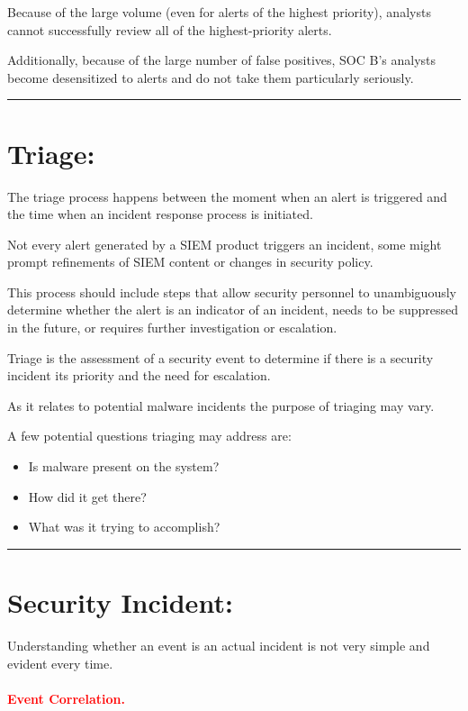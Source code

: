 \documentclass[british]{article}
\begin{document}
Because of the large volume (even for alerts of the highest priority),
analysts cannot successfully review all of the highest-priority alerts.

Additionally, because of the large number of false positives, SOC
B's analysts become desensitized to alerts and do not take them particularly
seriously.

\rule[0.5ex]{0.75\columnwidth}{1pt}

\section{Triage:}

The triage process happens between the moment when an alert is triggered
and the time when an incident response process is initiated.

Not every alert generated by a SIEM product triggers an incident,
some might prompt refinements of SIEM content or changes in security
policy.

This process should include steps that allow security personnel to
unambiguously determine whether the alert is an indicator of an incident,
needs to be suppressed in the future, or requires further investigation
or escalation.

Triage is the assessment of a security event to determine if there
is a security incident its priority and the need for escalation.

As it relates to potential malware incidents the purpose of triaging
may vary.

A few potential questions triaging may address are:
\begin{itemize}
	\item Is malware present on the system?
	\item How did it get there?
	\item What was it trying to accomplish?
\end{itemize}
\rule[0.5ex]{0.75\columnwidth}{1pt}

\section{Security Incident:}

Understanding whether an event is an actual incident is not very simple
and evident every time.

\paragraph{\textcolor{red}{Event Correlation.}}
\end{document}
